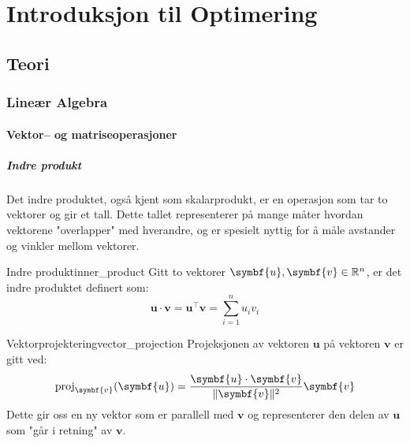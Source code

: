 \part{Introduksjon til Optimering}
\label{part:introduction}

\chapter{Teori}
\label{chap:mathematical_foundations}

\section{Lineær Algebra}

\subsection{Vektor-- og matriseoperasjoner}

\subsubsection{Indre produkt}
Det indre produktet, også kjent som skalarprodukt, er en operasjon som tar to vektorer og gir et tall.
Dette tallet representerer på mange måter hvordan vektorene "overlapper" med hverandre, og er spesielt nyttig for å måle avstander og vinkler mellom vektorer.

\begin{definition}{Indre produkt}{inner_product}
	Gitt to vektorer \( \symbf{u}, \symbf{v} \in \R^n \), er det indre produktet definert som:
	\[
		\symbf{u} \cdot \symbf{v} = \symbf{u}^\top \symbf{v} = \sum_{i=1}^{n} u_i v_i
	\]
\end{definition}

\begin{corollary}{Vektorprojektering}{vector_projection}
	Projeksjonen av vektoren \( \symbf{u} \) på vektoren \( \symbf{v} \) er gitt ved:
	\[
		\operatorname{proj}_{\symbf{v}}(\symbf{u}) = \frac{\symbf{u} \cdot \symbf{v}}{\norm{\symbf{v}}^2} \symbf{v}
	\]
	Dette gir oss en ny vektor som er parallell med \( \symbf{v} \) og representerer den delen av \( \symbf{u} \) som "går i retning" av \( \symbf{v} \).
\end{corollary}

